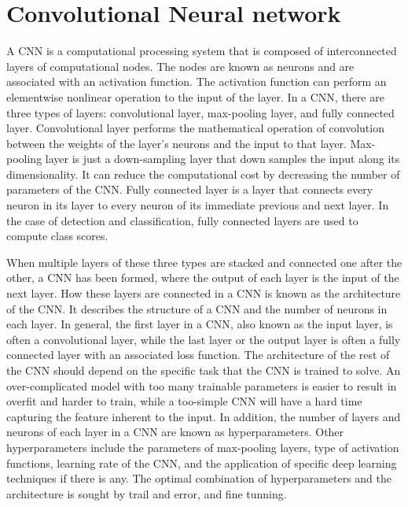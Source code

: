 \documentclass[aps,twocolumn,showpacs,groupedaddress, nofootinbib]{revtex4}  %
\begin{document}
\section{Convolutional Neural network}\label{sec:CNN}
A \ac{CNN} is a computational processing system that is composed of interconnected layers of computational nodes\cite{o2015introduction}.
The nodes are known as neurons and are associated with an activation function.
The activation function can perform an elementwise nonlinear operation to the input of the layer. 
In a \ac{CNN}, there are three types of layers: convolutional layer, max-pooling layer, and fully connected layer\cite{o2015introduction}.
Convolutional layer performs the mathematical operation of convolution between the weights of the layer's neurons and the input to that layer.
Max-pooling layer is just a down-sampling layer that down samples the input along its dimensionality.
It can reduce the computational cost by decreasing the number of parameters of the \ac{CNN}.
Fully connected layer is a layer that connects every neuron in its layer to every neuron of its immediate previous and next layer.
In the case of detection and classification, fully connected layers are used to compute class scores.

When multiple layers of these three types are stacked and connected one after the other, 
a \ac{CNN} has been formed, where the output of each layer is the input of the next layer.
How these layers are connected in a \ac{CNN} is known as the architecture of the \ac{CNN}.
It describes the structure of a \ac{CNN} and the number of neurons in each layer. %
In general, the first layer in a \ac{CNN}, also known as the input layer, is often a convolutional layer, 
while the last layer or the output layer is often a fully connected layer with an associated loss function. 
The architecture of the rest of the \ac{CNN} should depend on the specific task that the \ac{CNN} is trained to solve. 
An over-complicated model with too many trainable parameters 
is easier to result in overfit and harder to train, 
while a too-simple \ac{CNN} will have a hard time capturing the feature inherent to the input.
In addition, the number of layers and neurons of each layer in a \ac{CNN} are known as hyperparameters.
Other hyperparameters include the parameters of max-pooling layers, type of activation functions, 
learning rate of the \ac{CNN}, and the application of specific deep learning techniques if there is any.
The optimal combination of hyperparameters and the architecture is sought by trail and error, and fine tunning.
\end{document}
